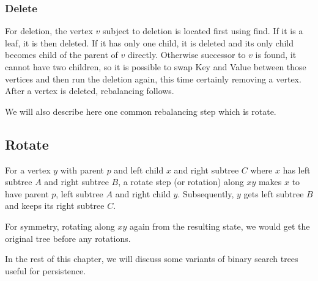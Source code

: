 \subsubsection*{Delete}
For deletion, the vertex $v$ subject to deletion is located first using find. If it is a leaf, it is then deleted. If it has only one child, it is deleted and its only child becomes child of the parent of $v$ directly. Otherwise successor to $v$ is found, it cannot have two children, so it is possible to swap Key and Value between those vertices and then run the deletion again, this time certainly removing a vertex. After a vertex is deleted, rebalancing follows.

We will also describe here one common rebalancing step which is rotate.

\subsection*{Rotate}

For a vertex $y$ with parent $p$ and left child $x$ and right subtree $C$ where $x$ has left subtree $A$ and right subtree $B$, a rotate step (or rotation) along $xy$ makes $x$ to have parent $p$, left subtree $A$ and right child $y$. Subsequently, $y$ gets left subtree $B$ and keeps its right subtree $C$.

For symmetry, rotating along $xy$ again from the resulting state, we would get the original tree before any rotations.



In the rest of this chapter, we will discuss some variants of binary search trees useful for persistence.